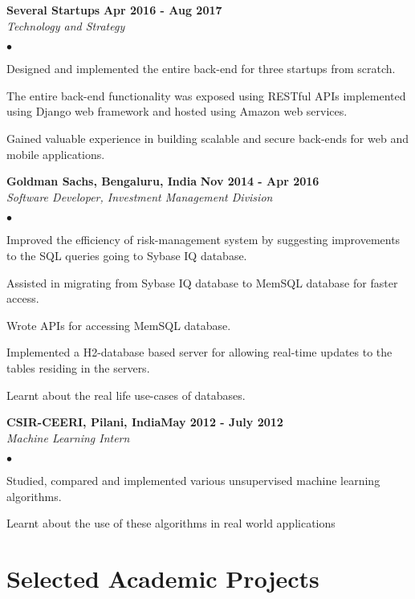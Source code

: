 \documentclass[margin,line]{res}
\newenvironment{list2}{
  \begin{list}{$\bullet$}{%
      \setlength{\itemsep}{0in}
      \setlength{\parsep}{0in} \setlength{\parskip}{0in}
      \setlength{\topsep}{0in} \setlength{\partopsep}{0in} 
      \setlength{\leftmargin}{0.2in}}}{\end{list}}
\begin{document}
\begin{resume}
{\bf Several Startups} \hfill {\bf Apr 2016 - Aug 2017}\\
{\em Technology and Strategy}
\vspace{.3cm}
\begin{list2}
\item Designed and implemented the entire back-end for three startups from scratch.
\item The entire back-end functionality was exposed using RESTful APIs implemented using Django web framework and hosted using Amazon web services.
\item Gained valuable experience in building scalable and secure back-ends for web and mobile applications.
\end{list2}

{\bf Goldman Sachs, Bengaluru, India} \hfill {\bf Nov 2014 - Apr 2016}\\
{\em Software Developer, Investment Management Division}
\vspace{.3cm}
\begin{list2}
\item Improved the efficiency of risk-management system by suggesting improvements to the SQL
queries going to Sybase IQ database.
\item Assisted in migrating from Sybase IQ database to MemSQL database for faster access.
\item Wrote APIs for accessing MemSQL database.
\item Implemented a H2-database based server for allowing real-time updates to the tables residing in
the servers.
\item Learnt about the real life use-cases of databases.
\end{list2}

{\bf CSIR-CEERI, Pilani, India}\hfill {\bf May 2012 - July 2012}\\
{\em Machine Learning Intern}
\vspace{.3cm}
\begin{list2}
\item Studied, compared and implemented various unsupervised machine learning algorithms.
\item Learnt about the use of these algorithms in real world applications
\end{list2}

\section{\sc Selected Academic Projects}


\end{resume}
\end{document}
